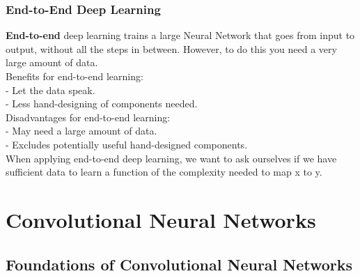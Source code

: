 \documentclass[11pt, a4paper]{article}
\begin{document}
\begin{spacing}{1.1}
	\subsubsection{End-to-End Deep Learning}
	\textbf{End-to-end} deep learning trains a large Neural Network that goes from input to output, without all the steps in between. However, to do this you need a very large amount of data. \vspace*{2mm} \\
	Benefits for end-to-end learning: \\
	\hspace*{3mm} - Let the data speak. \\
	\hspace*{3mm} - Less hand-designing of components needed. \vspace*{1mm} \\
	Disadvantages for end-to-end learning: \\
	\hspace*{3mm} - May need a large amount of data. \\
	\hspace*{3mm} - Excludes potentially useful hand-designed components. \vspace*{2mm} \\
	When applying end-to-end deep learning, we want to ask ourselves if we have sufficient data to learn a function of the complexity needed to map x to y. \newpage

	\section{Convolutional Neural Networks}
	\subsection{Foundations of Convolutional Neural Networks}

\end{spacing}
\end{document}
